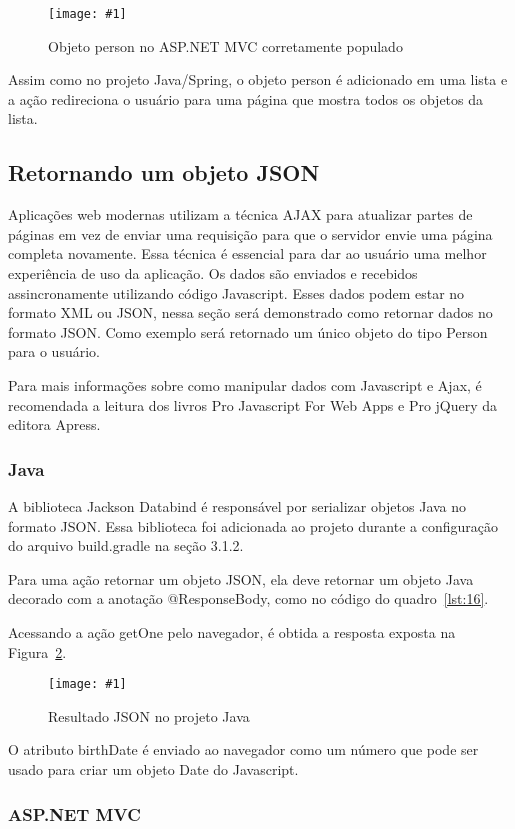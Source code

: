 \documentclass[a4paper,12pt]{article}
\newcommand{\figura}[3] {
	\begin{figure}[ht]
		\centering
		\texttt{[image: \#1]}
		\caption{#2}
		\label{#3}
	\end{figure}
	\FloatBarrier
}
\newcommand{\javacode}[3] {
	
	\FloatBarrier
}
\begin{document}
\figura{31.png}{Objeto person no ASP.NET MVC corretamente populado}{fig:31}

Assim como no projeto Java/Spring, o objeto person é adicionado em uma lista e a ação redireciona o usuário para uma página que mostra todos os objetos da lista.

\subsection{Retornando um objeto JSON}

Aplicações web modernas utilizam a técnica AJAX para atualizar partes de páginas em vez de enviar uma requisição para que o servidor envie uma página completa novamente. Essa técnica é essencial para dar ao usuário uma melhor experiência de uso da aplicação. Os dados são enviados e recebidos assincronamente utilizando código Javascript. Esses dados podem estar no formato XML ou JSON, nessa seção será demonstrado como retornar dados no formato JSON. Como exemplo será retornado um único objeto do tipo Person para o usuário.

Para mais informações sobre como manipular dados com Javascript e Ajax, é recomendada a leitura dos livros Pro Javascript For Web Apps e Pro jQuery da editora Apress.

\subsubsection{Java}

A biblioteca Jackson Databind é responsável por serializar objetos Java no formato JSON. Essa biblioteca foi adicionada ao projeto durante a configuração do arquivo build.gradle na seção 3.1.2. 

Para uma ação retornar um objeto JSON, ela deve retornar um objeto Java decorado com a anotação @ResponseBody, como no código do quadro~\ref{lst:16}.

\javacode{code/16.txt}{Ação no Spring MVC que retorna um objeto JSON}{lst:16}

Acessando a ação getOne pelo navegador, é obtida a resposta exposta na Figura~\ref{fig:32}.

\figura{32.png}{Resultado JSON no projeto Java}{fig:32}

O atributo birthDate é enviado ao navegador como um número que pode ser usado para criar um objeto Date do Javascript.

\subsubsection{ASP.NET MVC}
\end{document}
